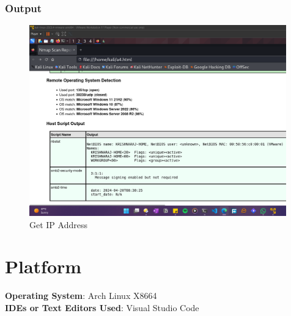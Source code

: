 \documentclass[11pt]{article}
\begin{document}
\subsubsection*{Output}
\begin{figure}[H]
    \centering
    \includegraphics[width=0.99\textwidth]{a4 (7).png}
    \caption{Get IP Address}
    \label{fig:1}
\end{figure}


\section{Platform}
\textbf{Operating System}: Arch Linux X8664 \\
\textbf{IDEs or Text Editors Used}: Visual Studio Code\\

% 
\end{document}

